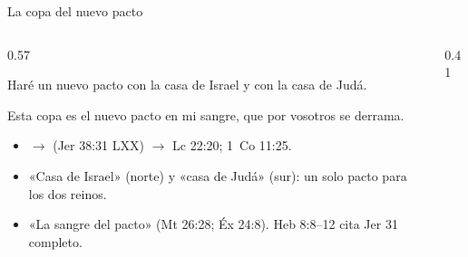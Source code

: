 \begin{frame}{La copa del nuevo pacto}
\begin{columns}[c,onlytextwidth]
\begin{column}{0.57\textwidth}
\begin{cita}Haré un nuevo pacto con la casa de Israel y con la casa de Judá.\end{cita}
\begin{cita}Esta copa es el nuevo pacto en mi sangre, que por vosotros se derrama.\end{cita}
\scriptsize
\begin{itemize}
\item {} $\to$  (Jer 38:31 LXX) $\to$ Lc 22:20; 1~Co 11:25.
\item «Casa de Israel» (norte) y «casa de Judá» (sur): un solo pacto para los dos reinos.
\item «La sangre del pacto» (Mt 26:28; Éx 24:8). Heb 8:8--12 cita Jer 31 completo.
\end{itemize}
\end{column}
\begin{column}{0.41\textwidth}\end{column}
\end{columns}
\end{frame}

